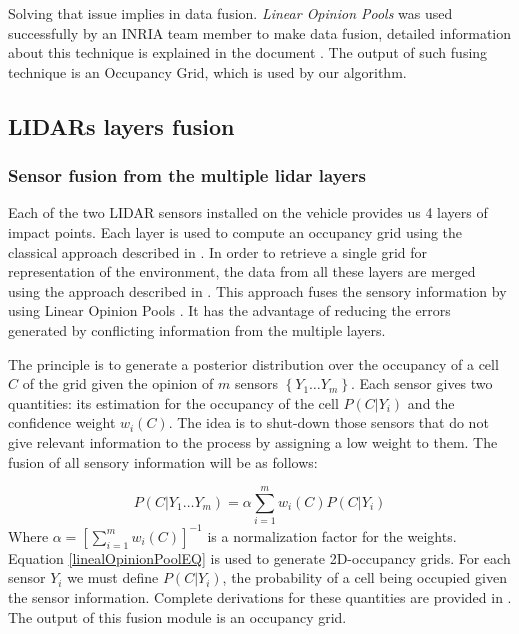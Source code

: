 Solving that issue implies in data fusion. \textit{Linear Opinion Pools} was used successfully by an INRIA team member to make data fusion, detailed information about this technique is explained in the document \cite{ADARVE-2012-671211}. The output of such fusing technique is an Occupancy Grid, which is used by our algorithm.

\subsection{LIDARs layers fusion}

\subsubsection{Sensor fusion from the multiple lidar layers}
Each of the  two LIDAR sensors installed on the vehicle provides us 4 layers of impact points. Each layer is used to compute an occupancy grid using the classical approach described in \cite{Thrun05}. In order to retrieve a single grid for representation of the environment, the data from all these layers are merged using the approach described in \cite{ADARVE-2012-671211}. This approach fuses the sensory information by using Linear Opinion Pools \cite{DeGroot1974}. It has the advantage of reducing the errors generated by conflicting information from the multiple layers.

The principle is to generate a posterior distribution over the occupancy of a cell $C$ of the grid given the opinion of $m$ sensors $\left\{ Y_1 \dots Y_m \right\}$.
Each sensor gives two quantities: its estimation for the occupancy of the cell $P(C | Y_i)$ and the confidence weight $w_i(C)$.
The idea is to shut-down those sensors that do not give relevant information to the process by assigning a low weight to them. The fusion of all sensory information will be as follows:

\begin{equation}
\label{linealOpinionPoolEQ}
  P(C | Y_1 \dots Y_m) = \alpha \sum \limits^m_{i=1} w_i(C) P(C | Y_i)
\end{equation}
Where $\alpha = \left[ \sum \limits^m_{i=1} w_i(C) \right]^{-1}$ is a normalization factor for the weights.  Equation \eqref{linealOpinionPoolEQ} is used to generate
2D-occupancy grids. For each sensor $Y_i$ we must define $P(C | Y_i)$, the probability of a cell being occupied given the sensor information. Complete derivations for these quantities are provided in \cite{ADARVE-2012-671211}. The output of this fusion module is an occupancy grid. %

